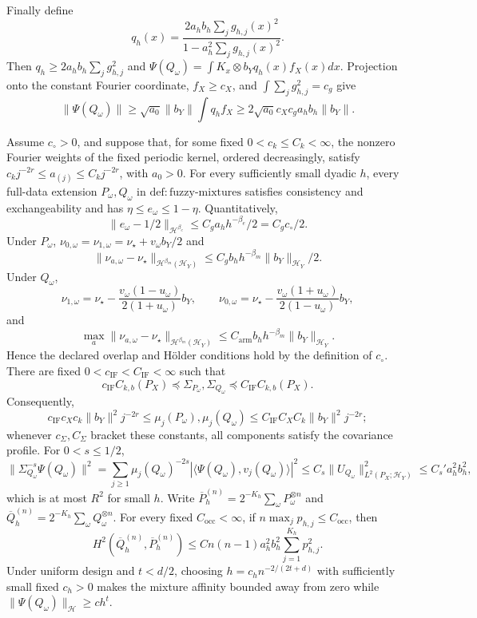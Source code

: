 Finally define
\[
q_h(x)=\frac{2a_hb_h\sum_jg_{h,j}(x)^2}
 {1-a_h^2\sum_jg_{h,j}(x)^2}.
\]
Then \(q_h\ge2a_hb_h\sum_jg_{h,j}^2\) and
\(\Psi(Q_\omega)=\int K_x\otimes b_Yq_h(x)f_X(x)dx\). Projection onto the constant Fourier coordinate, \(f_X\ge c_X\), and \(\int\sum_jg_{h,j}^2=c_g\) give
\[
\|\Psi(Q_\omega)\|
\ge\sqrt{a_0}\|b_Y\|\int q_hf_X
\ge2\sqrt{a_0}c_Xc_ga_hb_h\|b_Y\|.
\]

Assume \(c_\circ>0\), and suppose that, for some fixed \(0<c_k\le C_k<\infty\), the nonzero Fourier weights of the fixed periodic kernel, ordered decreasingly, satisfy \(c_kj^{-2r}\le a_{(j)}\le C_kj^{-2r}\), with \(a_0>0\). For every sufficiently small dyadic \(h\), every full-data extension \(P_\omega,Q_\omega\) in \(\mathrm{def{:}fuzzy\mbox{-}mixtures}\) satisfies consistency and exchangeability and has \(\eta\le e_\omega\le1-\eta\). Quantitatively,
\[
\|e_\omega-1/2\|_{\mathcal H^{\beta_e}}\le C_ga_hh^{-\beta_e}/2=C_gc_\circ/2.
\]
Under \(P_\omega\), \(\nu_{0,\omega}=\nu_{1,\omega}=\nu_\star+v_\omega b_Y/2\) and
\[
\|\nu_{a,\omega}-\nu_\star\|_{\mathcal H^{\beta_m}(\mathcal H_Y)}
\le C_gb_hh^{-\beta_m}\|b_Y\|_{\mathcal H_Y}/2.
\]
Under \(Q_\omega\),
\[
\nu_{1,\omega}=\nu_\star-\frac{v_\omega(1-u_\omega)}{2(1+u_\omega)}b_Y,\qquad
\nu_{0,\omega}=\nu_\star-\frac{v_\omega(1+u_\omega)}{2(1-u_\omega)}b_Y,
\]
and
\[
\max_a\|\nu_{a,\omega}-\nu_\star\|_{\mathcal H^{\beta_m}(\mathcal H_Y)}
\le C_{\mathrm{arm}}b_hh^{-\beta_m}\|b_Y\|_{\mathcal H_Y}.
\]
Hence the declared overlap and Hölder conditions hold by the definition of \(c_\circ\). There are fixed \(0<c_{\mathrm{IF}}<C_{\mathrm{IF}}<\infty\) such that
\[
c_{\mathrm{IF}}C_{k,b}(P_X)\preceq\Sigma_{P_\omega},\Sigma_{Q_\omega}
\preceq C_{\mathrm{IF}}C_{k,b}(P_X).
\]
Consequently,
\[
c_{\mathrm{IF}}c_Xc_k\|b_Y\|^2j^{-2r}
\le\mu_j(P_\omega),\mu_j(Q_\omega)
\le C_{\mathrm{IF}}C_XC_k\|b_Y\|^2j^{-2r};
\]
whenever \(c_\Sigma,C_\Sigma\) bracket these constants, all components satisfy the covariance profile. For \(0<s\le1/2\),
\[
\|\Sigma_{Q_\omega}^{-s}\Psi(Q_\omega)\|^2
=\sum_{j\ge1}\mu_j(Q_\omega)^{-2s}
 |\langle\Psi(Q_\omega),v_j(Q_\omega)\rangle|^2
\le C_s\|U_{Q_\omega}\|_{L^2(P_X;\mathcal H_Y)}^2
\le C_s'a_h^2b_h^2,
\]
which is at most \(R^2\) for small \(h\). Write
\(\overline P_h^{(n)}=2^{-K_h}\sum_\omega P_\omega^{\otimes n}\) and
\(\overline Q_h^{(n)}=2^{-K_h}\sum_\omega Q_\omega^{\otimes n}\).
For every fixed \(C_{\mathrm{occ}}<\infty\), if
\(n\max_jp_{h,j}\le C_{\mathrm{occ}}\), then
\[
H^2(\overline Q_h^{(n)},\overline P_h^{(n)})
\le Cn(n-1)a_h^2b_h^2\sum_{j=1}^{K_h}p_{h,j}^2.
\]
Under uniform design and \(t<d/2\), choosing \(h=c_hn^{-2/(2t+d)}\) with sufficiently small fixed \(c_h>0\) makes the mixture affinity bounded away from zero while \(\|\Psi(Q_\omega)\|_{\mathcal H}\ge ch^t\).

